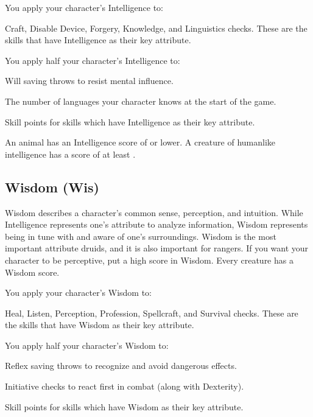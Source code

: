 You apply your character's Intelligence to:
\begin{itemize*}
\item Craft, Disable Device, Forgery, Knowledge, and Linguistics checks. These are the skills that have Intelligence as their key attribute.
\end{itemize*}

\par You apply half your character's Intelligence to:
\begin{itemize*}
\item Will saving throws to resist mental influence.
\item The number of languages your character knows at the start of the game.
\item Skill points for skills which have Intelligence as their key attribute.
\end{itemize*}

\par An animal has an Intelligence score of  or lower. A creature of humanlike intelligence has a score of at least .

\subsection{Wisdom (Wis)}
Wisdom describes a character's common sense, perception, and intuition. While Intelligence represents one's attribute to analyze information, Wisdom represents being in tune with and aware of one's surroundings. Wisdom is the most important attribute druids, and it is also important for rangers. If you want your character to be perceptive, put a high score in Wisdom. Every creature has a Wisdom score.

You apply your character's Wisdom to:
\begin{itemize*}
\item Heal, Listen, Perception, Profession, Spellcraft, and Survival checks. These are the skills that have Wisdom as their key attribute.
\end{itemize*}
You apply half your character's Wisdom to:
\begin{itemize*}
\item Reflex saving throws to recognize and avoid dangerous effects.
\item Initiative checks to react first in combat (along with Dexterity).
\item Skill points for skills which have Wisdom as their key attribute.
\end{itemize*}

